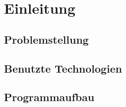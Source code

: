 \chapter{Einleitung}

\section{Problemstellung}

\section{Benutzte Technologien}

\section{Programmaufbau}
